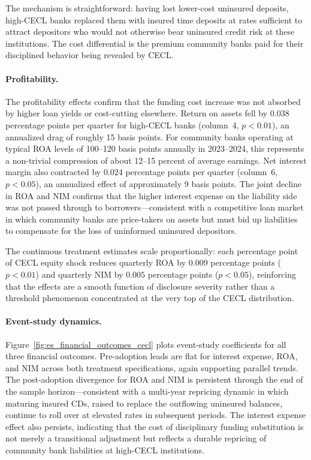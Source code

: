 The mechanism is straightforward: having lost lower-cost uninsured deposits,
high-CECL banks replaced them with insured time deposits at rates sufficient to
attract depositors who would not otherwise bear uninsured credit risk at these
institutions. The cost differential is the premium community banks paid for their
disciplined behavior being revealed by CECL.

\paragraph{Profitability.}
The profitability effects confirm that the funding cost increase was not absorbed
by higher loan yields or cost-cutting elsewhere. Return on assets fell by $0.038$
percentage points per quarter for high-CECL banks (column~4, $p < 0.01$), an
annualized drag of roughly 15 basis points. For community banks operating at
typical ROA levels of 100--120 basis points annually in 2023--2024, this
represents a non-trivial compression of about 12--15 percent of average earnings.
Net interest margin also contracted by $0.024$ percentage points per quarter
(column~6, $p < 0.05$), an annualized effect of approximately 9 basis points.
The joint decline in ROA and NIM confirms that the higher interest expense on
the liability side was not passed through to borrowers---consistent with a
competitive loan market in which community banks are price-takers on assets but
must bid up liabilities to compensate for the loss of uninformed uninsured
depositors.

The continuous treatment estimates scale proportionally: each percentage point of
CECL equity shock reduces quarterly ROA by $0.009$ percentage points ($p < 0.01$)
and quarterly NIM by $0.005$ percentage points ($p < 0.05$), reinforcing that
the effects are a smooth function of disclosure severity rather than a threshold
phenomenon concentrated at the very top of the CECL distribution.

\paragraph{Event-study dynamics.}
Figure~\ref{fig:es_financial_outcomes_cecl} plots event-study coefficients for
all three financial outcomes. Pre-adoption leads are flat for interest expense,
ROA, and NIM across both treatment specifications, again supporting parallel
trends. The post-adoption divergence for ROA and NIM is persistent through the
end of the sample horizon---consistent with a multi-year repricing dynamic in
which maturing insured CDs, raised to replace the outflowing uninsured balances,
continue to roll over at elevated rates in subsequent periods. The interest
expense effect also persists, indicating that the cost of disciplinary funding
substitution is not merely a transitional adjustment but reflects a durable
repricing of community bank liabilities at high-CECL institutions.

